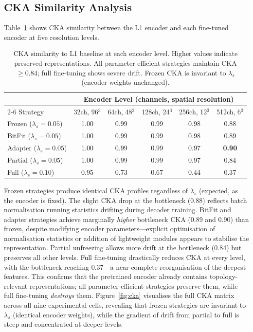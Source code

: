 \documentclass[runningheads]{llncs}
\begin{document}
\subsection{CKA Similarity Analysis}

Table~\ref{tab:cka} shows CKA similarity between the L1 encoder and each fine-tuned encoder at five resolution levels.

\begin{table}[t]
\caption{CKA similarity to L1 baseline at each encoder level. Higher values indicate preserved representations. All parameter-efficient strategies maintain CKA${\geq}0.84$; full fine-tuning shows severe drift. Frozen CKA is invariant to $\lambda_s$ (encoder weights unchanged).}
\label{tab:cka}
\centering
\small
\begin{tabular}{lccccc}
\toprule
 & \multicolumn{5}{c}{Encoder Level (channels, spatial resolution)} \\
\cmidrule(lr){2-6}
Strategy & 32ch, 96$^3$ & 64ch, 48$^3$ & 128ch, 24$^3$ & 256ch, 12$^3$ & 512ch, 6$^3$ \\
\midrule
Frozen ($\lambda_s{=}0.05$)  & 1.00 & 0.99 & 0.99 & 0.98 & 0.88 \\
BitFit ($\lambda_s{=}0.05$)  & 1.00 & 0.99 & 0.99 & 0.98 & 0.89 \\
Adapter ($\lambda_s{=}0.05$) & 1.00 & 0.99 & 0.99 & 0.97 & \textbf{0.90} \\
Partial ($\lambda_s{=}0.05$) & 1.00 & 0.99 & 0.99 & 0.97 & 0.84 \\
Full ($\lambda_s{=}0.10$)    & 0.95 & 0.73 & 0.67 & 0.44 & 0.37 \\
\bottomrule
\end{tabular}
\end{table}

Frozen strategies produce identical CKA profiles regardless of $\lambda_s$ (expected, as the encoder is fixed).
The slight CKA drop at the bottleneck (0.88) reflects batch normalisation running statistics drifting during decoder training.
BitFit and adapter strategies achieve marginally \emph{higher} bottleneck CKA (0.89 and 0.90) than frozen, despite modifying encoder parameters---explicit optimisation of normalisation statistics or addition of lightweight modules appears to stabilise the representation.
Partial unfreezing allows more drift at the bottleneck (0.84) but preserves all other levels.
Full fine-tuning drastically reduces CKA at every level, with the bottleneck reaching 0.37---a near-complete reorganisation of the deepest features.
This confirms that the pretrained encoder already contains topology-relevant representations; all parameter-efficient strategies preserve them, while full fine-tuning \emph{destroys} them.
Figure~\ref{fig:cka} visualises the full CKA matrix across all nine experimental cells, revealing that frozen strategies are invariant to $\lambda_s$ (identical encoder weights), while the gradient of drift from partial to full is steep and concentrated at deeper levels.
\end{document}
